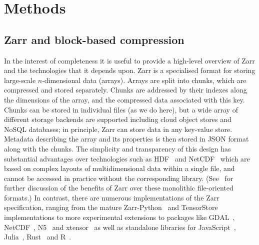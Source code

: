 \documentclass[a4paper,num-refs]{oup-contemporary}
\begin{document}
\section{Methods}

\subsection{Zarr and block-based compression}
In the interest of completeness it is useful to provide a high-level overview
of Zarr and the technologies that it depends upon. Zarr is a specialised format
for storing large-scale $n$-dimensional data (arrays). Arrays
are split into chunks, which are compressed and stored separately. Chunks are 
addressed by their indexes along the dimensions of the array, and the 
compressed data associated with this key. Chunks can
be stored in individual files (as we do here), but a wide array of different
storage backends are supported including cloud object stores 
and NoSQL databases;
in principle, Zarr can store data in any key-value store.
Metadata describing the array and its properties is then stored 
in JSON format along with the chunks. 
The simplicity and transparency
of this design has substantial advantages over technologies
such as HDF~\citep{folk2011overview} and 
NetCDF~\citep{rew1990netcdf} which are based on complex
layouts of multidimensional data within a single file,
and cannot be accessed in practice without the corresponding library.
(See~\cite{abernathey2021cloud} for further discussion of the benefits
of Zarr over these monolithic file-oriented formats.)
In contrast, there are numerous implementations 
of the Zarr specification, ranging 
from the mature Zarr-Python~\citep{zarrpython}
and TensorStore~\citep{tensorstore} implementations
to more experimental extensions to packages like
GDAL~\citep{gdal_zarr},
NetCDF~\citep{netcfd_c},
N5~\citep{n5zarr}
and xtensor~\citep{xtensor_zarr}
as well as  standalone libraries for JavaScript~\cite{zarrjs},
Julia~\cite{zarrjl}, Rust~\citep{zarrs}
and R~\cite{pizzarr}.
\end{document}
